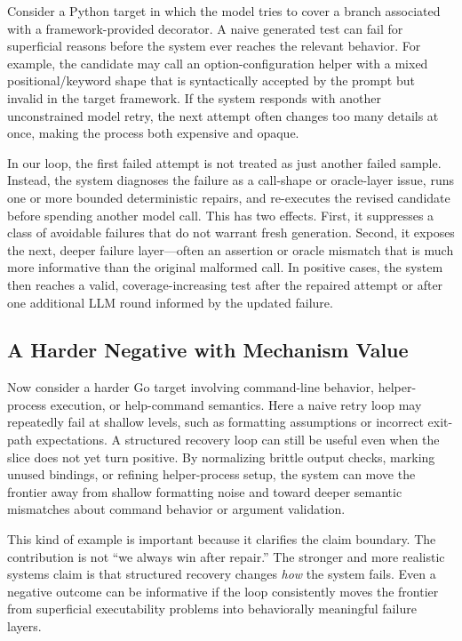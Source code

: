 \documentclass[10pt]{article}
\begin{document}
Consider a Python target in which the model tries to cover a branch associated with a framework-provided decorator. A naive generated test can fail for superficial reasons before the system ever reaches the relevant behavior. For example, the candidate may call an option-configuration helper with a mixed positional/keyword shape that is syntactically accepted by the prompt but invalid in the target framework. If the system responds with another unconstrained model retry, the next attempt often changes too many details at once, making the process both expensive and opaque.

In our loop, the first failed attempt is not treated as just another failed sample. Instead, the system diagnoses the failure as a call-shape or oracle-layer issue, runs one or more bounded deterministic repairs, and re-executes the revised candidate before spending another model call. This has two effects. First, it suppresses a class of avoidable failures that do not warrant fresh generation. Second, it exposes the next, deeper failure layer---often an assertion or oracle mismatch that is much more informative than the original malformed call. In positive cases, the system then reaches a valid, coverage-increasing test after the repaired attempt or after one additional LLM round informed by the updated failure.

\subsection{A Harder Negative with Mechanism Value}

Now consider a harder Go target involving command-line behavior, helper-process execution, or help-command semantics. Here a naive retry loop may repeatedly fail at shallow levels, such as formatting assumptions or incorrect exit-path expectations. A structured recovery loop can still be useful even when the slice does not yet turn positive. By normalizing brittle output checks, marking unused bindings, or refining helper-process setup, the system can move the frontier away from shallow formatting noise and toward deeper semantic mismatches about command behavior or argument validation.

This kind of example is important because it clarifies the claim boundary. The contribution is not ``we always win after repair.'' The stronger and more realistic systems claim is that structured recovery changes \emph{how} the system fails. Even a negative outcome can be informative if the loop consistently moves the frontier from superficial executability problems into behaviorally meaningful failure layers.
\end{document}
